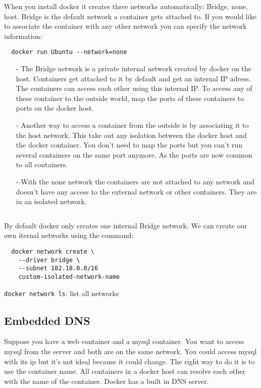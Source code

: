 \documentclass[french]{article}
\begin{document}
When you install docker it creates three networks automatically: Bridge, none, host. Bridge is the default network a container gets attached to. If you would like to associate the container with any other network you can specify the network information:
\begin{verbatim}
  docker run Ubuntu --network=none
\end{verbatim}
\begin{itemize}
  \item [-] The Bridge network is a private internal network created by docker on the host. Containers get attached to it by default and get an internal IP adress. The containers can access each other using this internal IP. To access any of these container to the outside world, map the ports of these containers to ports on the docker host.
  \item [-] Another way to access a container from the outside is by associating it to the host network. This take out any isolation between the docker host and the docker container. You don't need to map the ports but you can't run several containers on the same port anymore. As the ports are now common to all containers.
  \item [-] With the none network the containers are not attached to any network and doesn't have any access to the external network or other containers. They are in an isolated network.
\end{itemize}$ $

By default docker only creates one internal Bridge network. We can create our own iternal networks using the command:
\begin{verbatim}
  docker network create \
    --driver bridge \
    --subnet 182.18.0.0/16
    custom-isolated-network-name
\end{verbatim}

\verb|docker network ls|: list all networks

\subsection{Embedded DNS}

Suppose you have a web container and a mysql container. You want to access mysql from the server and both are on the same network. You could access mysql with its ip but it's not ideal because it could change. The right way to do it is to use the container name. All containers in a docker host can resolve each other with the name of the container. Docker has a built in DNS server.
\end{document}
